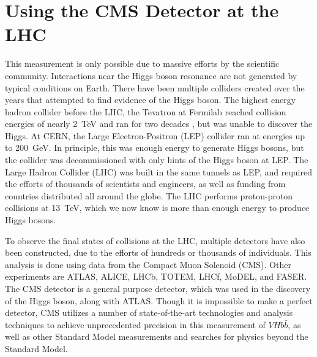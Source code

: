 \section{Using the CMS Detector at the LHC}

This measurement is only possible due to massive efforts by the scientific community.
Interactions near the Higgs boson resonance are not generated by typical conditions on Earth.
There have been multiple colliders created over the years that attempted to find evidence of the Higgs boson.
The highest energy hadron collider before the LHC,
the Tevatron at Fermilab reached collision energies of nearly \SI{2}{TeV}
and ran for two decades \cite{Holmes_2011}, but was unable to discover the Higgs.
At CERN, the Large Electron-Positron (LEP) collider \cite{Myers:226776} ran at energies up to \SI{200}{GeV}.
In principle, this was enough energy to generate Higgs bosons,
but the collider was decommissioned with only hints of the Higgs boson at LEP.
The Large Hadron Collider (LHC) was built in the same tunnels as LEP, and
required the efforts of thousands of scientists and engineers,
as well as funding from countries distributed all around the globe.
The LHC performs proton-proton collisions at \SI{13}{TeV},
which we now know is more than enough energy to produce Higgs bosons.

To observe the final states of collisions at the LHC,
multiple detectors have also been constructed,
due to the efforts of hundreds or thousands of individuals.
This analysis is done using data from the Compact Muon Solenoid (CMS).
Other experiments are ATLAS, ALICE, LHCb, TOTEM, LHCf, MoDEL, and FASER.
The CMS detector is a general purpose detector,
which was used in the discovery of the Higgs boson, along with ATLAS.
Though it is impossible to make a perfect detector,
CMS utilizes a number of state-of-the-art technologies and analysis techniques
to achieve unprecedented precision in this measurement of $V\!Hb\bar{b}$,
as well as other Standard Model measurements and searches for
physics beyond the Standard Model.
